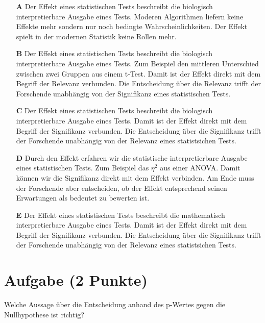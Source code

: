 \documentclass[a4paper, 9pt]{scrartcl}\usepackage[]{graphicx}\usepackage[]{xcolor}
\begin{document}
\begin{enumerate}
\item [\textbf{A} \msquare] Der Effekt eines statistischen Tests beschreibt die biologisch interpretierbare Ausgabe eines Tests. Moderen Algorithmen liefern keine Effekte mehr sondern nur noch bedingte Wahrscheinlichkeiten. Der Effekt spielt in der modernen Statistik keine Rollen mehr.
\item [\textbf{B} \msquare] Der Effekt eines statistischen Tests beschreibt die biologisch interpretierbare Ausgabe eines Tests. Zum Beispiel den mittleren Unterschied zwischen zwei Gruppen aus einem t-Test. Damit ist der Effekt direkt mit dem Begriff der Relevanz verbunden. Die Entscheidung über die Relevanz trifft der Forschende unabhängig von der Signifikanz eines statistischen Tests.
\item [\textbf{C} \msquare] Der Effekt eines statistischen Tests beschreibt die biologisch interpretierbare Ausgabe eines Tests. Damit ist der Effekt direkt mit dem Begriff der Signifikanz verbunden. Die Entscheidung über die Signifikanz trifft der Forschende unabhängig von der Relevanz eines statistsichen Tests.
\item [\textbf{D} \msquare] Durch den Effekt erfahren wir die statistische interpretierbare Ausgabe eines statistischen Tests. Zum Beispiel das $\eta^2$ aus einer ANOVA. Damit können wir die Signifikanz direkt mit dem Effekt verbinden. Am Ende muss der Forschende aber entscheiden, ob der Effekt entsprechend seinen Erwartungen als bedeutet zu bewerten ist.
\item [\textbf{E} \msquare] Der Effekt eines statistischen Tests beschreibt die mathematisch interpretierbare Ausgabe eines Tests. Damit ist der Effekt direkt mit dem Begriff der Signifikanz verbunden. Die Entscheidung über die Signifikanz trifft der Forschende unabhängig von der Relevanz eines statistsichen Tests.
\end{enumerate}

\section{Aufgabe \hfill (2 Punkte)}



Welche Aussage über die Entscheidung anhand des p-Wertes gegen die
Nullhypothese ist richtig?
\end{document}
